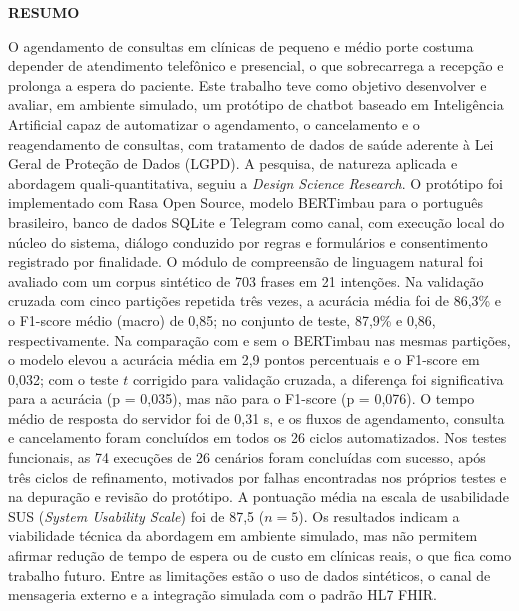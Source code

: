 \documentclass[12pt,a4paper]{extarticle}
\begin{document}
\newpage
\thispagestyle{empty}
\begin{center}
    \textbf{RESUMO}
\end{center}
\vspace{0.5cm}

\noindent O agendamento de consultas em clínicas de pequeno e médio porte costuma depender de atendimento telefônico e presencial, o que sobrecarrega a recepção e prolonga a espera do paciente. Este trabalho teve como objetivo desenvolver e avaliar, em ambiente simulado, um protótipo de chatbot baseado em Inteligência Artificial capaz de automatizar o agendamento, o cancelamento e o reagendamento de consultas, com tratamento de dados de saúde aderente à Lei Geral de Proteção de Dados (LGPD). A pesquisa, de natureza aplicada e abordagem quali-quantitativa, seguiu a \textit{Design Science Research}. O protótipo foi implementado com Rasa Open Source, modelo BERTimbau para o português brasileiro, banco de dados SQLite e Telegram como canal, com execução local do núcleo do sistema, diálogo conduzido por regras e formulários e consentimento registrado por finalidade. O módulo de compreensão de linguagem natural foi avaliado com um corpus sintético de 703 frases em 21 intenções. Na validação cruzada com cinco partições repetida três vezes, a acurácia média foi de 86,3\% e o F1-score médio (macro) de 0,85; no conjunto de teste, 87,9\% e 0,86, respectivamente. Na comparação com e sem o BERTimbau nas mesmas partições, o modelo elevou a acurácia média em 2,9 pontos percentuais e o F1-score em 0,032; com o teste $t$ corrigido para validação cruzada, a diferença foi significativa para a acurácia (p = 0,035), mas não para o F1-score (p = 0,076). O tempo médio de resposta do servidor foi de 0,31 s, e os fluxos de agendamento, consulta e cancelamento foram concluídos em todos os 26 ciclos automatizados. Nos testes funcionais, as 74 execuções de 26 cenários foram concluídas com sucesso, após três ciclos de refinamento, motivados por falhas encontradas nos próprios testes e na depuração e revisão do protótipo. A pontuação média na escala de usabilidade SUS (\textit{System Usability Scale}) foi de 87,5 ($n = 5$). Os resultados indicam a viabilidade técnica da abordagem em ambiente simulado, mas não permitem afirmar redução de tempo de espera ou de custo em clínicas reais, o que fica como trabalho futuro. Entre as limitações estão o uso de dados sintéticos, o canal de mensageria externo e a integração simulada com o padrão HL7 FHIR.
\end{document}
